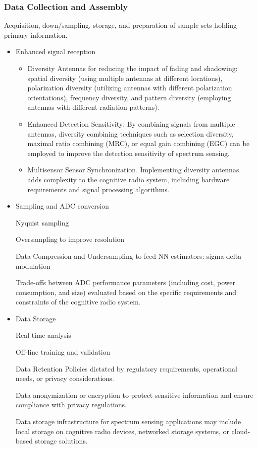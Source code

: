 \documentclass[17pt,a4paper]{extarticle}
\begin{document}
\subsubsection{Data Collection and Assembly}
Acquisition, down/sampling, storage, and preparation of sample sets holding primary information.

\begin{itemize}
\item Enhanced signal reception  
\begin{itemize}
\item
Diversity Antennas for reducing the impact of fading and shadowing:  spatial diversity (using multiple antennas at different locations), polarization diversity (utilizing antennas with different polarization orientations), frequency diversity, and pattern diversity (employing antennas with different radiation patterns).
\item 
Enhanced Detection Sensitivity: By combining signals from multiple antennas, diversity combining techniques such as selection diversity, maximal ratio combining (MRC), or equal gain combining (EGC) can be employed to improve the detection sensitivity of spectrum sensing.
 \item  
Multisensor Sensor Synchronization. Implementing diversity antennas adds complexity to the cognitive radio system, including hardware requirements and signal processing algorithms.
\end{itemize}
\item Sampling and  ADC conversion

Nyquist sampling

Oversampling to improve resolution

Data Compression and Undersampling to feed NN estimators: sigma-delta modulation

Trade-offs between ADC performance parameters (including cost, power consumption, and size)  evaluated based on the specific requirements and constraints of the cognitive radio system.
\item Data Storage

Real-time analysis

Off-line training and validation

Data Retention Policies dictated by regulatory requirements, operational needs, or privacy considerations.

Data anonymization or encryption to protect sensitive information and ensure compliance with privacy regulations.

Data storage infrastructure for spectrum sensing applications may include local storage on cognitive radio devices, networked storage systems, or cloud-based storage solutions.
\end{itemize}
\clearpage\newpage
\end{document}

